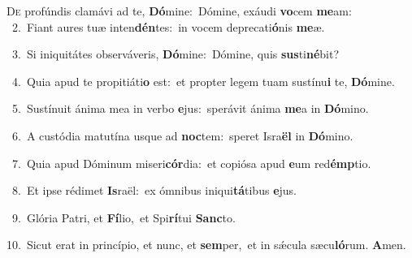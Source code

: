 \lettrine{\initial\textcolor{\initialcolor}{D}}{e} profúndis clamávi ad te, \textbf{Dó}\-mine:~\star Dómine, exáudi \textbf{vo}\-cem \textbf{me}\-am:\\
{\numbfont\textcolor{\numbcolor}{~2.}}~Fiant aures tuæ inten\-\textbf{dén}\-tes:~\star in vocem deprecati\-\textbf{ó}\-nis \textbf{me}\-æ.\par
{\numbfont\textcolor{\numbcolor}{~3.}}~Si iniquitátes observáveris, \textbf{Dó}\-mine:~\star Dómine, quis \textbf{sus}\-ti\-\textbf{né}\-bit?\par
{\numbfont\textcolor{\numbcolor}{~4.}}~Quia apud te propitiáti\textbf{o} est:~\star et propter legem tuam sustínu\textbf{i} te, \textbf{Dó}\-mine.\par
{\numbfont\textcolor{\numbcolor}{~5.}}~Sustínuit ánima mea in verbo \textbf{e}\-jus:~\star sperávit ánima \textbf{me}\-a in \textbf{Dó}\-mino.\par
{\numbfont\textcolor{\numbcolor}{~6.}}~A custódia matutína usque ad \textbf{noc}\-tem:~\star speret Isra\textbf{ël} in \textbf{Dó}\-mino.\par
{\numbfont\textcolor{\numbcolor}{~7.}}~Quia apud Dóminum miseri\-\textbf{cór}\-dia:~\star et copiósa apud \textbf{e}\-um red\-\textbf{émp}\-tio.\par
{\numbfont\textcolor{\numbcolor}{~8.}}~Et ipse rédimet \textbf{Is}\-raël:~\star ex ómnibus iniqui\-\textbf{tá}\-tibus \textbf{e}\-jus.\par
{\numbfont\textcolor{\numbcolor}{~9.}}~Glória Patri, et \textbf{Fí}\-lio,~\star et Spi\-\textbf{rí}\-tui \textbf{Sanc}\-to.\par
{\numbfont\textcolor{\numbcolor}{10.}}~Sicut erat in princípio, et nunc, et \textbf{sem}\-per,~\star et in sǽcula sæcu\-\textbf{ló}\-rum. \textbf{A}\-men.\par
